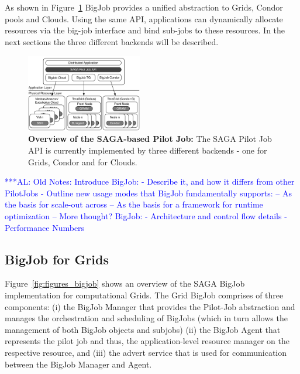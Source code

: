 \documentclass[conference,final]{IEEEtran}
\newcommand{\alnote}[1]{ {\textcolor{blue} { ***AL: #1 }}}
\newcommand{\alnote}[1]{}
\begin{document}
As shown in Figure~\ref{fig:figures_distributed_pilot_job} BigJob provides
a unified abstraction to Grids, Condor pools and Clouds. Using the same API,
applications can dynamically allocate resources via the big-job interface and
bind sub-jobs to these resources. In the next sections the three different backends
will be described.
\begin{figure}[htbp]
    \centering
        \includegraphics[width=0.45\textwidth]{figures/distributed_pilot_job}
    \caption{\textbf{Overview of the SAGA-based Pilot Job:} The SAGA Pilot Job API is
    currently implemented by three different backends - one for Grids, Condor and 
    for Clouds.}
    \label{fig:figures_distributed_pilot_job}
\end{figure}

\alnote{Old Notes: 
Introduce BigJob:
 - Describe it, and how it differs from other PilotJobs
 - Outline new usage modes that BigJob fundamentally supports:
    -- As the basis for scale-out across
    -- As the basis for a framework for runtime optimization
    -- More thought?
BigJob:
 - Architecture and control flow details
 - Performance Numbers}

\subsection{BigJob for Grids}

Figure~\ref{fig:figures_bigjob} shows an overview of the SAGA BigJob 
implementation for computational Grids. The Grid BigJob comprises 
of three components: (i) the BigJob Manager that
provides the Pilot-Job abstraction and manages the orchestration and
scheduling of BigJobs (which in turn allows the management of both
BigJob objects and subjobs) (ii) the BigJob Agent that represents the
pilot job and thus, the application-level resource manager on the
respective resource, and (iii) the advert service that is used for
communication between the BigJob Manager and Agent.
\end{document}
